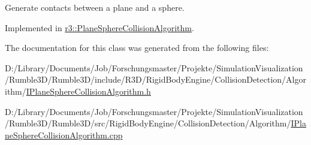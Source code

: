 Generate contacts between a plane and a sphere. 



Implemented in \mbox{\hyperlink{classr3_1_1_plane_sphere_collision_algorithm_a6823dc80b23ce77beabd26a9c2a9d9ed}{r3\+::\+Plane\+Sphere\+Collision\+Algorithm}}.



The documentation for this class was generated from the following files\+:\begin{DoxyCompactItemize}
\item 
D\+:/\+Library/\+Documents/\+Job/\+Forschungsmaster/\+Projekte/\+Simulation\+Visualization/\+Rumble3\+D/\+Rumble3\+D/include/\+R3\+D/\+Rigid\+Body\+Engine/\+Collision\+Detection/\+Algorithm/\mbox{\hyperlink{_i_plane_sphere_collision_algorithm_8h}{I\+Plane\+Sphere\+Collision\+Algorithm.\+h}}\item 
D\+:/\+Library/\+Documents/\+Job/\+Forschungsmaster/\+Projekte/\+Simulation\+Visualization/\+Rumble3\+D/\+Rumble3\+D/src/\+Rigid\+Body\+Engine/\+Collision\+Detection/\+Algorithm/\mbox{\hyperlink{_i_plane_sphere_collision_algorithm_8cpp}{I\+Plane\+Sphere\+Collision\+Algorithm.\+cpp}}\end{DoxyCompactItemize}
